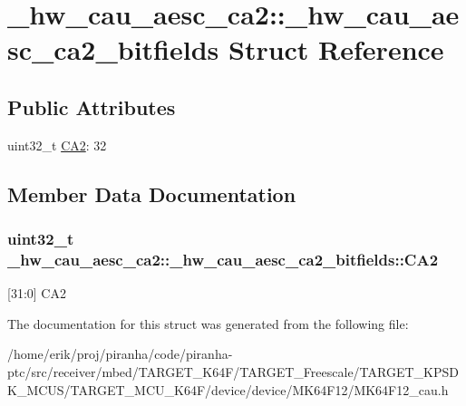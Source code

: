 \hypertarget{struct__hw__cau__aesc__ca2_1_1__hw__cau__aesc__ca2__bitfields}{}\section{\+\_\+hw\+\_\+cau\+\_\+aesc\+\_\+ca2\+:\+:\+\_\+hw\+\_\+cau\+\_\+aesc\+\_\+ca2\+\_\+bitfields Struct Reference}
\label{struct__hw__cau__aesc__ca2_1_1__hw__cau__aesc__ca2__bitfields}
\subsection*{Public Attributes}
\begin{DoxyCompactItemize}
\item 
uint32\+\_\+t \hyperlink{struct__hw__cau__aesc__ca2_1_1__hw__cau__aesc__ca2__bitfields_a9873bf490e79ce1e00392d74e1684526}{C\+A2}\+: 32
\end{DoxyCompactItemize}


\subsection{Member Data Documentation}
\subsubsection[{\texorpdfstring{C\+A2}{CA2}}]{\setlength{\rightskip}{0pt plus 5cm}uint32\+\_\+t \+\_\+hw\+\_\+cau\+\_\+aesc\+\_\+ca2\+::\+\_\+hw\+\_\+cau\+\_\+aesc\+\_\+ca2\+\_\+bitfields\+::\+C\+A2}\hypertarget{struct__hw__cau__aesc__ca2_1_1__hw__cau__aesc__ca2__bitfields_a9873bf490e79ce1e00392d74e1684526}{}\label{struct__hw__cau__aesc__ca2_1_1__hw__cau__aesc__ca2__bitfields_a9873bf490e79ce1e00392d74e1684526}
\mbox{[}31\+:0\mbox{]} C\+A2 

The documentation for this struct was generated from the following file\+:\begin{DoxyCompactItemize}
\item 
/home/erik/proj/piranha/code/piranha-\/ptc/src/receiver/mbed/\+T\+A\+R\+G\+E\+T\+\_\+\+K64\+F/\+T\+A\+R\+G\+E\+T\+\_\+\+Freescale/\+T\+A\+R\+G\+E\+T\+\_\+\+K\+P\+S\+D\+K\+\_\+\+M\+C\+U\+S/\+T\+A\+R\+G\+E\+T\+\_\+\+M\+C\+U\+\_\+\+K64\+F/device/device/\+M\+K64\+F12/M\+K64\+F12\+\_\+cau.\+h\end{DoxyCompactItemize}
